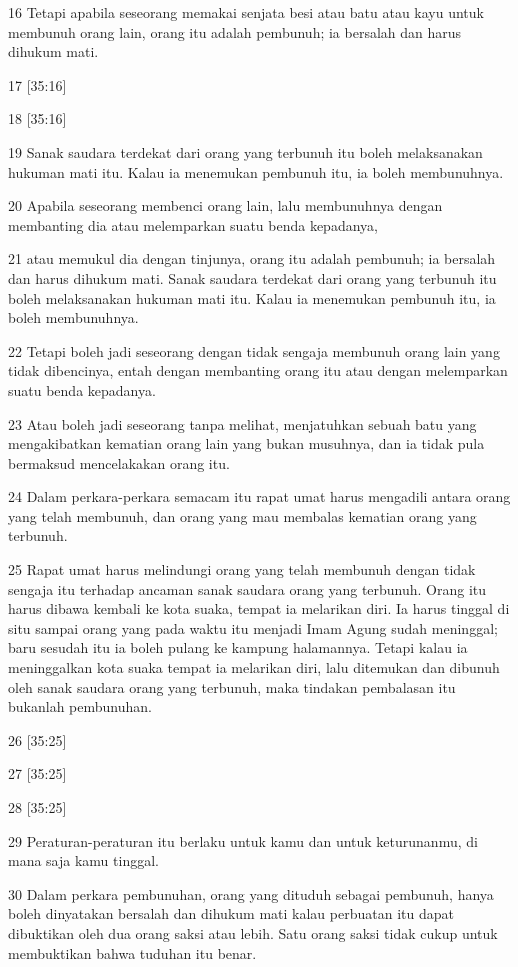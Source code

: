 \par 16 Tetapi apabila seseorang memakai senjata besi atau batu atau kayu untuk membunuh orang lain, orang itu adalah pembunuh; ia bersalah dan harus dihukum mati.
\par 17 [35:16]
\par 18 [35:16]
\par 19 Sanak saudara terdekat dari orang yang terbunuh itu boleh melaksanakan hukuman mati itu. Kalau ia menemukan pembunuh itu, ia boleh membunuhnya.
\par 20 Apabila seseorang membenci orang lain, lalu membunuhnya dengan membanting dia atau melemparkan suatu benda kepadanya,
\par 21 atau memukul dia dengan tinjunya, orang itu adalah pembunuh; ia bersalah dan harus dihukum mati. Sanak saudara terdekat dari orang yang terbunuh itu boleh melaksanakan hukuman mati itu. Kalau ia menemukan pembunuh itu, ia boleh membunuhnya.
\par 22 Tetapi boleh jadi seseorang dengan tidak sengaja membunuh orang lain yang tidak dibencinya, entah dengan membanting orang itu atau dengan melemparkan suatu benda kepadanya.
\par 23 Atau boleh jadi seseorang tanpa melihat, menjatuhkan sebuah batu yang mengakibatkan kematian orang lain yang bukan musuhnya, dan ia tidak pula bermaksud mencelakakan orang itu.
\par 24 Dalam perkara-perkara semacam itu rapat umat harus mengadili antara orang yang telah membunuh, dan orang yang mau membalas kematian orang yang terbunuh.
\par 25 Rapat umat harus melindungi orang yang telah membunuh dengan tidak sengaja itu terhadap ancaman sanak saudara orang yang terbunuh. Orang itu harus dibawa kembali ke kota suaka, tempat ia melarikan diri. Ia harus tinggal di situ sampai orang yang pada waktu itu menjadi Imam Agung sudah meninggal; baru sesudah itu ia boleh pulang ke kampung halamannya. Tetapi kalau ia meninggalkan kota suaka tempat ia melarikan diri, lalu ditemukan dan dibunuh oleh sanak saudara orang yang terbunuh, maka tindakan pembalasan itu bukanlah pembunuhan.
\par 26 [35:25]
\par 27 [35:25]
\par 28 [35:25]
\par 29 Peraturan-peraturan itu berlaku untuk kamu dan untuk keturunanmu, di mana saja kamu tinggal.
\par 30 Dalam perkara pembunuhan, orang yang dituduh sebagai pembunuh, hanya boleh dinyatakan bersalah dan dihukum mati kalau perbuatan itu dapat dibuktikan oleh dua orang saksi atau lebih. Satu orang saksi tidak cukup untuk membuktikan bahwa tuduhan itu benar.
